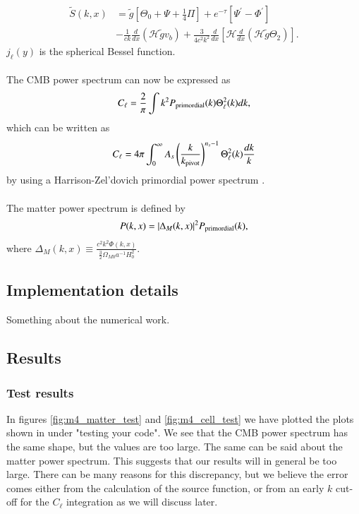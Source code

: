 \documentclass{aa}
\begin{document}
\begin{equation}
   \begin{aligned}
   \tilde{S}(k,x) &= \tilde{g}\left[ \Theta_0 + \Psi + \frac{1}{4}\Pi\right] + e^{-\tau} \left[\Psi^\prime-\Phi^\prime\right] \\
   &-\frac{1}{ck}\frac{d}{dx}(\mathcal{H}\tilde{g}v_b) + \frac{3}{4c^2k^2} \frac{d}{dx}
   \left[\mathcal{H}\frac{d}{dx} (\mathcal{H}\tilde{g}\Theta_2)\right]. 
   \end{aligned}
\end{equation}
$j_\ell(y)$ is the spherical Bessel function.\\
\\
The CMB power spectrum can now be expressed as 
   \begin{equation}
      C_\ell = \frac{2}{\pi}\int k^2P_{\rm primordial}(k) \Theta_\ell^2(k)dk,
   \end{equation}
which can be written as 
\begin{equation}\label{eq:m4_cell}
   C_\ell = 4\pi \int_0^{\infty} A_s \left(\frac{k}{k_{\rm pivot}}\right)^{n_s-1} \Theta_\ell^2(k) \frac{dk}{k}
\end{equation}
by using a Harrison-Zel'dovich primordial power spectrum \cite{winther:2023}.\\
\\
The matter power spectrum is defined by
\begin{equation}
   P(k,x) = |\Delta_M(k,x)|^2P_{\rm primordial}(k),
\end{equation}
where $\Delta_M(k,x) \equiv \frac{c^2k^2\Phi(k,x)}{\frac{3}{2}\Omega_{M 0} a^{-1} H_0^2}$.
\subsection{Implementation details}
Something about the numerical work.

\subsection{Results}

\subsubsection{Test results}
In figures \ref{fig:m4_matter_test} and \ref{fig:m4_cell_test} we have plotted the plots shown in \cite{winther:2023} under "testing your code". We see that the CMB power
spectrum has the same shape, but the values are too large. The same can be said about the matter power spectrum. This suggests that our results will in general be too large.
There can be many reasons for this discrepancy, but we believe the error comes either from the calculation of the source function, or from an early $k$ cut-off for the $C_\ell$ integration as we will discuss later.
\end{document}
